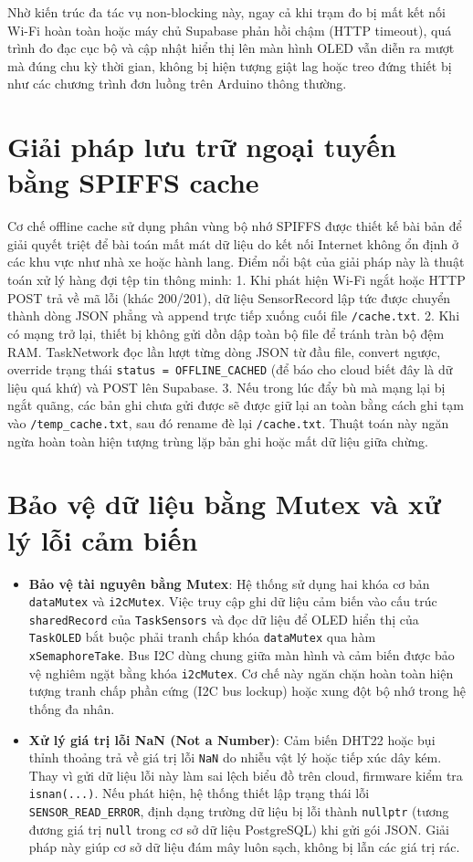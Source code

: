 Nhờ kiến trúc đa tác vụ non-blocking này, ngay cả khi trạm đo bị mất kết nối Wi-Fi hoàn toàn hoặc máy chủ Supabase phản hồi chậm (HTTP timeout), quá trình đo đạc cục bộ và cập nhật hiển thị lên màn hình OLED vẫn diễn ra mượt mà đúng chu kỳ thời gian, không bị hiện tượng giật lag hoặc treo đứng thiết bị như các chương trình đơn luồng trên Arduino thông thường.

\section{Giải pháp lưu trữ ngoại tuyến bằng SPIFFS cache}
Cơ chế offline cache sử dụng phân vùng bộ nhớ SPIFFS được thiết kế bài bản để giải quyết triệt để bài toán mất mát dữ liệu do kết nối Internet không ổn định ở các khu vực như nhà xe hoặc hành lang.
Điểm nổi bật của giải pháp này là thuật toán xử lý hàng đợi tệp tin thông minh:
1. Khi phát hiện Wi-Fi ngắt hoặc HTTP POST trả về mã lỗi (khác 200/201), dữ liệu SensorRecord lập tức được chuyển thành dòng JSON phẳng và append trực tiếp xuống cuối file \texttt{/cache.txt}.
2. Khi có mạng trở lại, thiết bị không gửi dồn dập toàn bộ file để tránh tràn bộ đệm RAM. TaskNetwork đọc lần lượt từng dòng JSON từ đầu file, convert ngược, override trạng thái \texttt{status = OFFLINE\_CACHED} (để báo cho cloud biết đây là dữ liệu quá khứ) và POST lên Supabase.
3. Nếu trong lúc đẩy bù mà mạng lại bị ngắt quãng, các bản ghi chưa gửi được sẽ được giữ lại an toàn bằng cách ghi tạm vào \texttt{/temp\_cache.txt}, sau đó rename đè lại \texttt{/cache.txt}. Thuật toán này ngăn ngừa hoàn toàn hiện tượng trùng lặp bản ghi hoặc mất dữ liệu giữa chừng.

\section{Bảo vệ dữ liệu bằng Mutex và xử lý lỗi cảm biến}
\begin{itemize}
    \item \textbf{Bảo vệ tài nguyên bằng Mutex}: Hệ thống sử dụng hai khóa cơ bản \texttt{dataMutex} và \texttt{i2cMutex}. Việc truy cập ghi dữ liệu cảm biến vào cấu trúc \texttt{sharedRecord} của \texttt{TaskSensors} và đọc dữ liệu để OLED hiển thị của \texttt{TaskOLED} bắt buộc phải tranh chấp khóa \texttt{dataMutex} qua hàm \texttt{xSemaphoreTake}. Bus I2C dùng chung giữa màn hình và cảm biến được bảo vệ nghiêm ngặt bằng khóa \texttt{i2cMutex}. Cơ chế này ngăn chặn hoàn toàn hiện tượng tranh chấp phần cứng (I2C bus lockup) hoặc xung đột bộ nhớ trong hệ thống đa nhân.
    \item \textbf{Xử lý giá trị lỗi NaN (Not a Number)}: Cảm biến DHT22 hoặc bụi thỉnh thoảng trả về giá trị lỗi \texttt{NaN} do nhiễu vật lý hoặc tiếp xúc dây kém. Thay vì gửi dữ liệu lỗi này làm sai lệch biểu đồ trên cloud, firmware kiểm tra \texttt{isnan(...)}. Nếu phát hiện, hệ thống thiết lập trạng thái lỗi \texttt{SENSOR\_READ\_ERROR}, định dạng trường dữ liệu bị lỗi thành \texttt{nullptr} (tương đương giá trị \texttt{null} trong cơ sở dữ liệu PostgreSQL) khi gửi gói JSON. Giải pháp này giúp cơ sở dữ liệu đám mây luôn sạch, không bị lẫn các giá trị rác.
\end{itemize}

